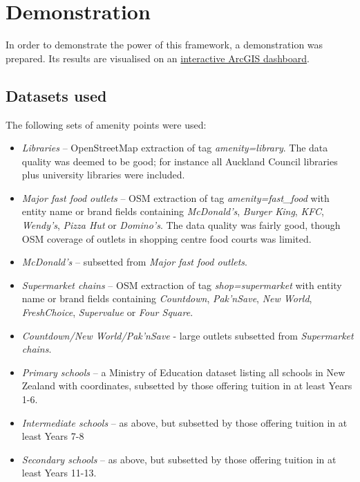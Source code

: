 \documentclass[12pt,a4paper]{article}
\begin{document}
\section{Demonstration}
\label{sec:demonstration}

In order to demonstrate the power of this framework, a demonstration was prepared. Its results are visualised on an \href{https://www.arcgis.com/apps/dashboards/2e46471d956347bcb0a1de8465ad31d7}{interactive ArcGIS dashboard}.

\subsection{Datasets used}
\label{sec:datasets}

The following sets of amenity points were used:

\begin{itemize}
	\item \emph{Libraries} -- OpenStreetMap extraction of tag \emph{amenity=library}. The data quality was deemed to be good; for instance all Auckland Council libraries plus university libraries were included.
	\item \emph{Major fast food outlets} -- OSM extraction of tag \emph{amenity=fast\_food} with entity name or brand fields containing \emph{McDonald's}, \emph{Burger King}, \emph{KFC}, \emph{Wendy's}, \emph{Pizza Hut} or \emph{Domino's}. The data quality was fairly good, though OSM coverage of outlets in shopping centre food courts was limited.
	\item \emph{McDonald's} -- subsetted from \emph{Major fast food outlets}.
	\item \emph{Supermarket chains} -- OSM extraction of tag \emph{shop=supermarket} with entity name or brand fields containing \emph{Countdown}, \emph{Pak'nSave}, \emph{New World}, \emph{FreshChoice}, \emph{Supervalue} or \emph{Four Square}.
	\item \emph{Countdown/New World/Pak'nSave} - large outlets subsetted from \emph{Supermarket chains}.
	\item \emph{Primary schools} -- a Ministry of Education dataset listing all schools in New Zealand with coordinates, subsetted by those offering tuition in at least Years 1-6.
	\item \emph{Intermediate schools} -- as above, but subsetted by those offering tuition in at least Years 7-8
	\item \emph{Secondary schools} -- as above, but subsetted by those offering tuition in at least Years 11-13.
\end{itemize}
\end{document}
